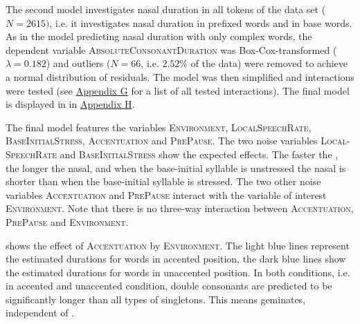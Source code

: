 The second model investigates nasal duration in all tokens of the data set ($N=2615)$, i.e. it investigates nasal duration in prefixed words and in base words. 
As in the model predicting nasal duration with only complex words, the dependent variable \textsc{AbsoluteConsonantDuration} was Box-Cox-transformed ($\lambda= 0.182$) and outliers ($N=66$, i.e. $ 2.52$\% of the data) were removed to achieve a normal distribution of residuals. The model was then simplified and interactions were tested (see \hyperref[Appendix G Summaries of tested interactions in experimental study]{Appendix G} for a list of all tested interactions). The final model is displayed in  in \hyperref[Appendix H: Model Summaries Experiment]{Appendix H}.


The final model features the variables \textsc{Environment}, \textsc{LocalSpeechRate}, \textsc{BaseInitialStress}, \textsc{Accentuation} and \textsc{PrePause}.
The two noise variables \textsc{Local-SpeechRate} and \textsc{BaseInitialStress} show the expected effects. The faster the , the longer the nasal, and when the base-initial syllable is unstressed the nasal is shorter than when the base-initial syllable is stressed.
The two other noise variables \textsc{Accentuation} and \textsc{PrePause} interact with the variable of interest \textsc{Environment}. Note that there is no three-way interaction between  \textsc{Accentuation}, \textsc{PrePause} and \textsc{Environment}.

 shows the effect of \textsc{Accentuation} by \textsc{Environment}. The light blue lines represent the estimated durations for words  in accented position, the dark blue lines show the estimated durations for words in unaccented position. In both conditions, i.e. in accented and unaccented condition, double consonants are predicted to be significantly longer than all types of singletons. This means  geminates, independent of .

